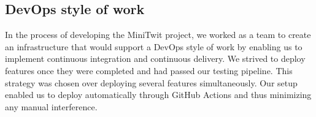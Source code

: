 \subsection{DevOps style of work}
In the process of developing the MiniTwit project, we worked as a team to create an infrastructure that would support a DevOps style of work by enabling us 
to implement continuous integration and continuous delivery. We strived to deploy features once they were completed and had passed our testing pipeline. This strategy was chosen over deploying several features simultaneously. Our setup enabled us to deploy automatically through GitHub Actions and thus minimizing any manual interference.